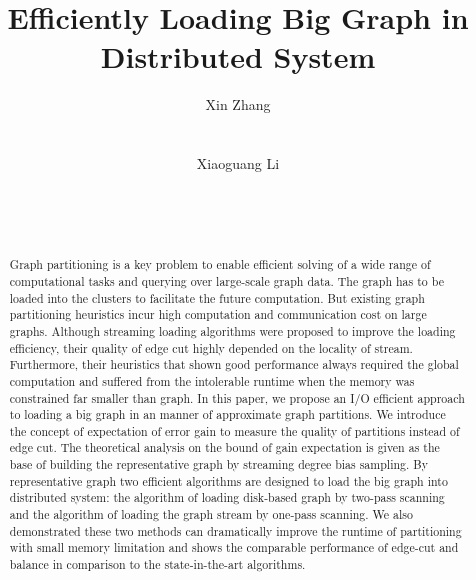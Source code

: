 \documentclass{sig-alternate-2013}
\begin{document}
\title{Efficiently Loading Big Graph in Distributed System
}

\author{
\alignauthor
Xin Zhang\\
       \\
       \\
\alignauthor
Xiaoguang Li\\
       \\
       \\
       \\
}
\maketitle

\begin{abstract}
Graph partitioning is a key problem to enable efficient solving of a wide range of computational tasks and querying over large-scale graph data. The graph has to be loaded into the clusters to facilitate the future computation. But existing graph partitioning heuristics incur high computation and communication cost on large graphs. Although streaming loading algorithms were proposed to improve the loading efficiency, their quality of edge cut highly depended on the locality of stream. Furthermore, their heuristics that shown good performance always required the global computation and suffered from the intolerable runtime when the memory was constrained far smaller than graph.
In this paper, we propose an I/O efficient approach to loading a big graph in an manner of approximate graph partitions.
We introduce the concept of expectation of error gain to measure the quality of partitions instead of edge cut.
The theoretical analysis on the bound of gain expectation is given as the base of building the representative graph by streaming degree bias sampling. By representative graph two efficient algorithms are designed to load the big graph into distributed system: the algorithm of loading disk-based graph by two-pass scanning and the algorithm of loading the graph stream by one-pass scanning. We also demonstrated these two methods can dramatically improve the runtime of partitioning with small memory limitation and shows the comparable performance of edge-cut and balance in comparison to the state-in-the-art algorithms.

\end{abstract}
\end{document}
